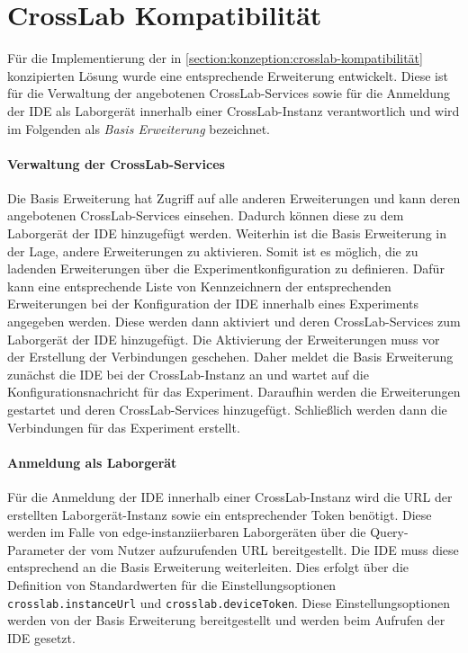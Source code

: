\section{CrossLab Kompatibilität}\label{section:prototypische-implementierung:crosslab-kompatibilität}


Für die Implementierung der in \autoref{section:konzeption:crosslab-kompatibilität} konzipierten Lösung wurde eine entsprechende Erweiterung entwickelt. Diese ist für die Verwaltung der angebotenen CrossLab-Services sowie für die Anmeldung der IDE als Laborgerät innerhalb einer CrossLab-Instanz verantwortlich und wird im Folgenden als \textit{Basis Erweiterung} bezeichnet.

\paragraph{Verwaltung der CrossLab-Services}
Die Basis Erweiterung hat Zugriff auf alle anderen Erweiterungen und kann deren angebotenen CrossLab-Services einsehen. Dadurch können diese zu dem Laborgerät der IDE hinzugefügt werden. Weiterhin ist die Basis Erweiterung in der Lage, andere Erweiterungen zu aktivieren. Somit ist es möglich, die zu ladenden Erweiterungen über die Experimentkonfiguration zu definieren. Dafür kann eine entsprechende Liste von Kennzeichnern der entsprechenden Erweiterungen bei der Konfiguration der IDE innerhalb eines Experiments angegeben werden. Diese werden dann aktiviert und deren CrossLab-Services zum Laborgerät der IDE hinzugefügt. Die Aktivierung der Erweiterungen muss vor der Erstellung der Verbindungen geschehen. Daher meldet die Basis Erweiterung zunächst die IDE bei der CrossLab-Instanz an und wartet auf die Konfigurationsnachricht für das Experiment. Daraufhin werden die Erweiterungen gestartet und deren CrossLab-Services hinzugefügt. Schließlich werden dann die Verbindungen für das Experiment erstellt.

\paragraph{Anmeldung als Laborgerät}
Für die Anmeldung der IDE innerhalb einer CrossLab-Instanz wird die URL der erstellten Laborgerät-Instanz sowie ein entsprechender Token benötigt. Diese werden im Falle von edge-instanziierbaren Laborgeräten über die Query-Parameter der vom Nutzer aufzurufenden URL bereitgestellt. Die IDE muss diese entsprechend an die Basis Erweiterung weiterleiten. Dies erfolgt über die Definition von Standardwerten für die Einstellungsoptionen \texttt{crosslab.instanceUrl} und \texttt{crosslab.deviceToken}. Diese Einstellungsoptionen werden von der Basis Erweiterung bereitgestellt und werden beim Aufrufen der IDE gesetzt.